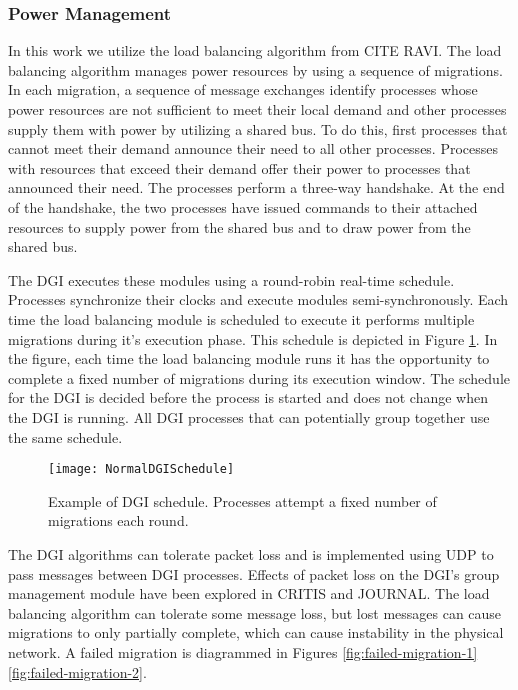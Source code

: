 \subsubsection{Power Management}

In this work we utilize the load balancing algorithm from CITE RAVI.
The load balancing algorithm manages power resources by using a sequence of migrations.
In each migration, a sequence of message exchanges identify processes whose power resources are not sufficient to meet their local demand and other processes supply them with power by utilizing a shared bus.
To do this, first processes that cannot meet their demand announce their need to all other processes.
Processes with resources that exceed their demand offer their power to processes that announced their need.
The processes perform a three-way handshake.
At the end of the handshake, the two processes have issued commands to their attached resources to supply power from the shared bus and to draw power from the shared bus.

The \ac{DGI} executes these modules using a round-robin real-time schedule.
Processes synchronize their clocks and execute modules semi-synchronously.
Each time the load balancing module is scheduled to execute it performs multiple migrations during it's execution phase.
This schedule is depicted in Figure \ref{fig:normal-schedule}.
In the figure, each time the load balancing module runs it has the opportunity to complete a fixed number of migrations during its execution window.
The schedule for the \ac{DGI} is decided before the process is started and does not change when the \ac{DGI} is running.
All \ac{DGI} processes that can potentially group together use the same schedule.

\begin{figure}
\texttt{[image: NormalDGISchedule]}
\caption{Example of \ac{DGI} schedule. Processes attempt a fixed number of migrations each round.} \label{fig:normal-schedule}
\end{figure}

The \ac{DGI} algorithms can tolerate packet loss and is implemented using UDP to pass messages between \ac{DGI} processes.
Effects of packet loss on the \ac{DGI}'s group management module have been explored in CRITIS and JOURNAL.
The load balancing algorithm can tolerate some message loss, but lost messages can cause migrations to only partially complete, which can cause instability in the physical network.
A failed migration is diagrammed in Figures \ref{fig:failed-migration-1} \ref{fig:failed-migration-2}.

